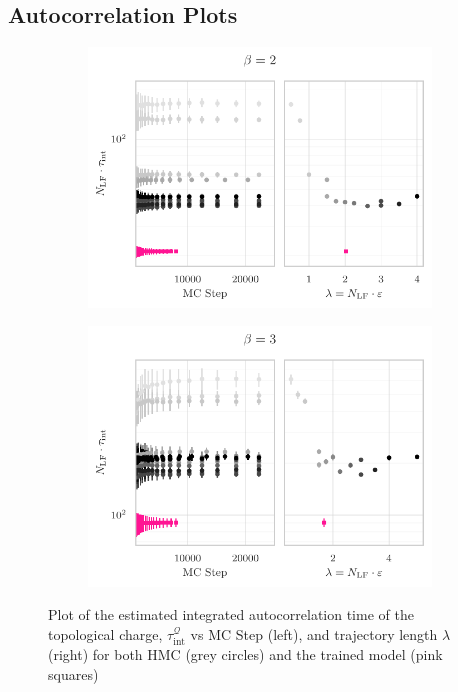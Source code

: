\documentclass{article} %
\begin{document}
\subsection{\label{subsec:autocorr_plots}Autocorrelation Plots}
%
\begin{figure}[htpb]
   \centering
   \begin{subfigure}{0.4\textwidth}
      \includegraphics[width=\textwidth]{figures/autocorr_plots_2021_03_09/autocorr_vs_traj_len_2153_b2.pdf}
   \end{subfigure}
   \begin{subfigure}{0.4\textwidth}
      \includegraphics[width=\textwidth]{figures/autocorr_plots_2021_03_09/autocorr_vs_traj_len_2151_b3.pdf}
   \end{subfigure}
   \caption{\label{fig:autocorrbeta23}Plot of the estimated integrated autocorrelation time of the topological charge,
      \(\tau_{\mathrm{int}}^{\mathcal{Q}}\) vs MC Step (left), and trajectory length \(\lambda\) (right) for both HMC
   (grey circles) and the trained model (pink squares)}
\end{figure}
\end{document}
